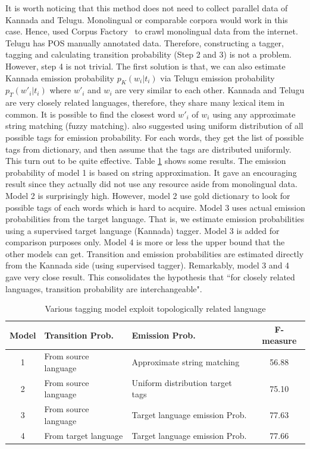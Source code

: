 It is worth noticing that this method does not need to collect parallel data of Kannada and Telugu. Monolingual or comparable corpora would work in this case. Hence,  used Corpus Factory~\cite{CorpusFactory} to crawl monolingual data from the internet. Telugu has POS manually annotated data. Therefore, constructing a tagger, tagging and calculating transition probability (Step 2 and 3) is not a problem. However, step 4 is not trivial. The first solution is that, we can also estimate Kannada emission probability $p_K(w_i|t_i)$ via Telugu emission probability $p_T(w'_i|t_i)$ where $w'_i$ and $w_i$ are very similar to each other. Kannada and Telugu are very closely related languages, therefore, they share many lexical item in common. It is possible to find the closest word $w'_i$ of $w_i$ using any approximate string matching (fuzzy matching).  also suggested using uniform distribution of all possible tags for emission probability. For each words, they get the list of possible tags from dictionary, and then assume that the tags are distributed uniformly. This turn out to be quite effective. Table \ref{tab:topologyRelatedLang} shows some results. The emission probability of model 1 is based on string approximation. It gave an encouraging result since they actually did not use any resource aside from monolingual data. Model 2 is surprisingly high. However, model 2 use gold dictionary to look for possible tags of each words which is hard to acquire. Model 3 uses actual emission probabilities from the target language. That is, we estimate emission probabilities using a supervised target language (Kannada) tagger. Model 3 is added for comparison purposes only. Model 4 is more or less the upper bound that the other models can get. Transition and emission probabilities are estimated directly from the Kannada side (using supervised tagger). Remarkably, model 3 and 4 gave very close result. This consolidates the hypothesis that ``for closely related languages, transition probability are interchangeable".
\begin{table}
  \centering
    \begin{tabular}{c|llc}
    \textbf{Model} & \textbf{Transition Prob.}& \textbf{Emission Prob.} & \textbf{F-measure} \\
	\hline
	1 & From source language & Approximate string matching & 56.88 \\
	2 & From source language & Uniform distribution target tags & 75.10 \\
	3 & From source language & Target language emission Prob. & 77.63 \\	
	4 & From target language & Target language emission Prob. & 77.66 \\		
    \end{tabular}%
 \caption{Various tagging model exploit topologically related language}
  \label{tab:topologyRelatedLang}%
\end{table}%

